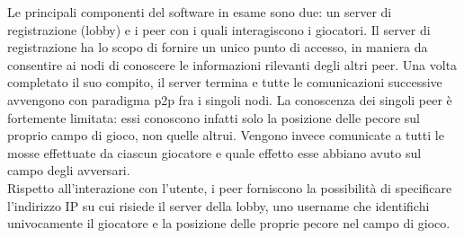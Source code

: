 Le principali componenti del software in esame sono due: un server di 
registrazione (lobby) e i peer con i quali interagiscono i giocatori.
Il server di registrazione ha lo scopo di fornire un unico punto di accesso, 
in maniera da consentire ai nodi di conoscere le informazioni rilevanti degli 
altri peer. Una volta completato il suo compito, il server termina e tutte le 
comunicazioni successive avvengono con paradigma p2p fra i singoli nodi.
La conoscenza dei singoli peer è fortemente limitata: essi conoscono infatti 
solo la posizione delle pecore sul proprio campo di gioco, non quelle altrui. 
Vengono invece comunicate a tutti le mosse effettuate da ciascun giocatore e 
quale effetto esse abbiano avuto sul campo degli avversari.
\\
Rispetto all'interazione con l'utente, i peer forniscono la possibilità di 
specificare l'indirizzo IP su cui risiede il server della lobby, uno username 
che identifichi univocamente il giocatore e la posizione delle proprie pecore 
nel campo di gioco.